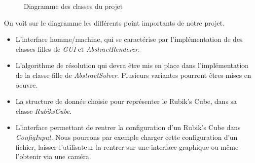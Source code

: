 \begin{figure}[h]
\begin{center}
\end{center}
    \caption{Diagramme des classes du projet}
\end{figure}

On voit sur le diagramme les différents point importants de notre projet. 
\begin{itemize}
    \item L'interface homme/machine, qui se caractérise par l'implémentation de des classes filles de \textit{GUI} et \textit{AbstractRenderer}.
    \item L'algorithme de résolution qui devra être mis en place dans l'implémentation de la classe fille de \textit{AbstractSolver}. Plusieurs variantes pourront êtres mises en oeuvre.
    \item La structure de donnée choisie pour représenter le Rubik's Cube, dans sa classe \textit{RubiksCube}.
    \item L'interface permettant de rentrer la configuration d'un Rubik's Cube dans \textit{ConfigInput}. Nous pourrons par exemple charger cette configuration d'un fichier, laisser l'utilisateur la rentrer sur une interface graphique ou même l'obtenir via une caméra.
\end{itemize}


